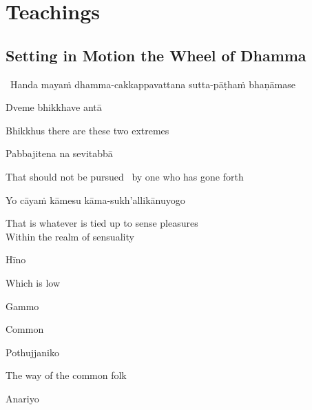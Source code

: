\ifdesktopversion
{}
\else
{}
\fi

\chapter{Teachings}

\section{Setting in Motion the Wheel of Dhamma}
\label{wheel-of-dhamma-abridged}

\begin{leader}
  \anglebracketleft\ \hspace{-0.5mm}Handa mayaṁ dhamma-cakkappavattana sutta-pāṭhaṁ bhaṇāmase \hspace{-0.5mm}\anglebracketright\
\end{leader}

Dveme bhikkhave antā

\begin{english}
  Bhikkhus there are these two extremes
\end{english}

Pabbajitena na sevitabbā

\begin{english}
  That should not be pursued \breathmark\ by one who has gone forth
\end{english}

Yo cāyaṁ kāmesu kāma-sukh'allikānuyogo

\begin{english}
  That is whatever is tied up to sense pleasures\\
  Within the realm of sensuality
\end{english}

Hīno

\begin{english}
  Which is low
\end{english}

Gammo

\begin{english}
  Common
\end{english}

Pothujjaniko

\begin{english}
  The way of the common folk
\end{english}

Anariyo

